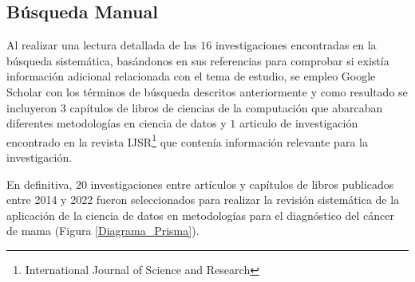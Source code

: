\subsection{Búsqueda Manual}
Al realizar una lectura detallada de las $16$ investigaciones encontradas en la búsqueda sistemática, basándonos en sus referencias para comprobar si existía información adicional relacionada con el tema de estudio, se empleo Google Scholar con los términos de búsqueda descritos anteriormente y como resultado se incluyeron $3$ capítulos de libros de ciencias de la computación que abarcaban diferentes metodologías en ciencia de datos y $1$ articulo de investigación encontrado en la revista IJSR\footnote{International Journal of Science and Research } que contenía información relevante para la investigación. 

En definitiva, $20$ investigaciones entre artículos y capítulos de libros publicados entre 2014 y 2022 fueron seleccionados para realizar la revisión sistemática de la aplicación de la ciencia de datos en metodologías para el diagnóstico del cáncer de mama (Figura \ref{Diagrama_Prisma}).
